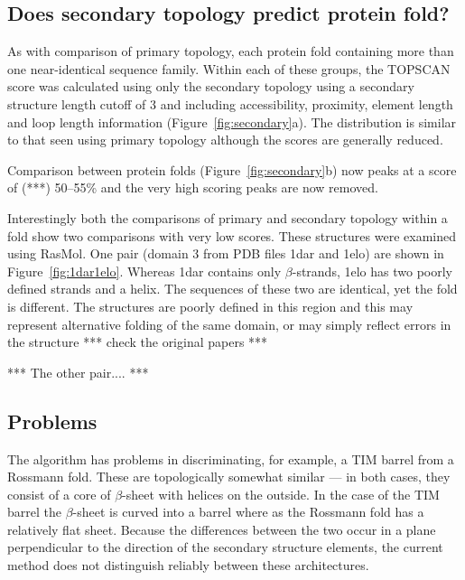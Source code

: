\documentclass{article}
\begin{document}
\subsection{Does secondary topology predict protein fold?}
As with comparison of primary topology, each protein fold containing
more than one near-identical sequence family. Within each of these
groups, the TOPSCAN score was calculated using only the secondary
topology using a secondary structure length cutoff of 3 and including
accessibility, proximity, element length and loop length information 
(Figure~\ref{fig:secondary}a). The distribution is similar to that
seen using primary topology although the scores are generally reduced.

Comparison between protein folds (Figure~\ref{fig:secondary}b) now
peaks at a score of (***) 50--55\% and the very high scoring peaks are
now removed.

Interestingly both the comparisons of primary and secondary topology
within a fold show two comparisons with very low scores. These
structures were examined using RasMol. One pair (domain 3 from PDB
files 1dar and 1elo) are shown in Figure~\ref{fig:1dar1elo}. Whereas
1dar contains only $\beta$-strands, 1elo has two poorly defined
strands and a helix. The sequences of these two are identical, yet the
fold is different. The structures are poorly defined in this region
and this may represent alternative folding of the same domain, or may
simply reflect errors in the structure {*** check the original papers
***}

{*** The other pair.... ***}


\subsection{Problems}
The algorithm has problems in discriminating, for example, a TIM
barrel from a Rossmann fold. These are topologically somewhat similar
--- in both cases, they consist of a core of $\beta$-sheet with
helices on the outside. In the case of the TIM barrel the
$\beta$-sheet is curved into a barrel where as the Rossmann fold has a
relatively flat sheet. Because the differences between the two occur
in a plane perpendicular to the direction of the secondary structure
elements, the current method does not distinguish reliably between these
architectures. 

\end{document}
